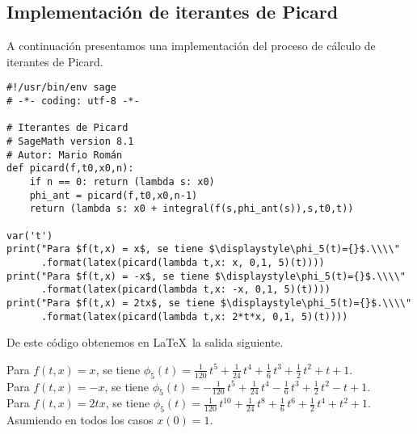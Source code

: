 \documentclass[11pt]{article}
\theoremstyle{plain}
\theoremstyle{definition}
\theoremstyle{remark}
\begin{document}
\begin{appendices}
\section{Implementación de iterantes de Picard}
A continuación presentamos una implementación del proceso de cálculo
de iterantes de Picard.

\begin{verbatim}
#!/usr/bin/env sage
# -*- coding: utf-8 -*-

# Iterantes de Picard
# SageMath version 8.1
# Autor: Mario Román
def picard(f,t0,x0,n):
    if n == 0: return (lambda s: x0)
    phi_ant = picard(f,t0,x0,n-1)
    return (lambda s: x0 + integral(f(s,phi_ant(s)),s,t0,t))

var('t')
print("Para $f(t,x) = x$, se tiene $\displaystyle\phi_5(t)={}$.\\\\"
      .format(latex(picard(lambda t,x: x, 0,1, 5)(t))))
print("Para $f(t,x) = -x$, se tiene $\displaystyle\phi_5(t)={}$.\\\\"
      .format(latex(picard(lambda t,x: -x, 0,1, 5)(t))))
print("Para $f(t,x) = 2tx$, se tiene $\displaystyle\phi_5(t)={}$.\\\\"      
      .format(latex(picard(lambda t,x: 2*t*x, 0,1, 5)(t))))
\end{verbatim}

De este código obtenemos en \LaTeX\ la salida siguiente.

Para $f(t,x) = x$, se tiene $\displaystyle\phi_5(t)=\frac{1}{120} \, t^{5} + \frac{1}{24} \, t^{4} + \frac{1}{6} \, t^{3} + \frac{1}{2} \, t^{2} + t + 1$.\\
Para $f(t,x) = -x$, se tiene $\displaystyle\phi_5(t)=-\frac{1}{120} \, t^{5} + \frac{1}{24} \, t^{4} - \frac{1}{6} \, t^{3} + \frac{1}{2} \, t^{2} - t + 1$.\\
Para $f(t,x) = 2tx$, se tiene $\displaystyle\phi_5(t)=\frac{1}{120} \, t^{10} + \frac{1}{24} \, t^{8} + \frac{1}{6} \, t^{6} + \frac{1}{2} \, t^{4} + t^{2} + 1$.\\

Asumiendo en todos los casos $x(0) = 1$.
\end{appendices}
\end{document}
